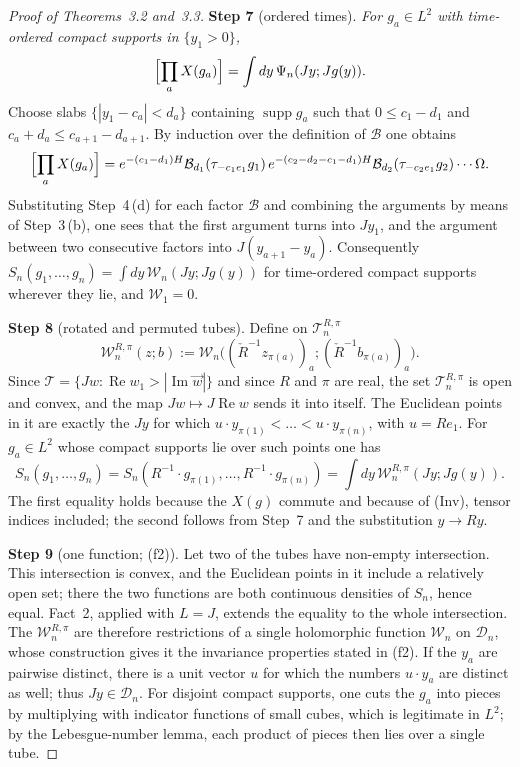 \documentclass[11pt,letterpaper,reqno]{amsart}
\theoremstyle{definition}
\begin{document}
\begin{proof}[Proof of Theorems~3.2 and~3.3]
\textbf{Step 7} (ordered times).
\emph{For $g_a\in L^2$ with time-ordered compact supports in $\{y_1>0\}$,}
\begin{equation*}
\Bigl[\prod_aX(g_a)\Bigr]=\int dy\,\Psi_n(Jy;Jg(y)).
\end{equation*}
Choose slabs $\{|y_1-c_a|<d_a\}$ containing $\operatorname{supp}g_a$ such that $0\le c_1-d_1$ and $c_a+d_a\le c_{a+1}-d_{a+1}$.
By induction over the definition of $\mathcal B$ one obtains
\begin{equation*}
\Bigl[\prod_aX(g_a)\Bigr]=e^{-(c_1-d_1)H}\mathcal B_{d_1}(\tau_{-c_1e_1}g_1)\,e^{-(c_2-d_2-c_1-d_1)H}\mathcal B_{d_2}(\tau_{-c_2e_1}g_2)\cdots\Omega.
\end{equation*}
Substituting Step~4\,(d) for each factor $\mathcal B$ and combining the arguments by means of Step~3\,(b), one sees that the first argument turns into $Jy_1$, and the argument between two consecutive factors into $J(y_{a+1}-y_a)$.
Consequently $S_n(g_1,\dots,g_n)=\int dy\,\mathcal W_n(Jy;Jg(y))$ for time-ordered compact supports wherever they lie, and $\mathcal W_1=0$.

\textbf{Step 8} (rotated and permuted tubes).
Define on $\mathcal T_n^{R,\pi}$
\begin{equation*}
\mathcal W_n^{R,\pi}(z;b):=\mathcal W_n\bigl((\check R^{-1}z_{\pi(a)})_a;(\check R^{-1}b_{\pi(a)})_a\bigr).
\end{equation*}
Since $\mathcal T=\{Jw:\operatorname{Re}w_1>|\operatorname{Im}\vec w|\}$ and since $R$ and $\pi$ are real, the set $\mathcal T_n^{R,\pi}$ is open and convex, and the map $Jw\mapsto J\operatorname{Re}w$ sends it into itself.
The Euclidean points in it are exactly the $Jy$ for which $u\cdot y_{\pi(1)}<\dots<u\cdot y_{\pi(n)}$, with $u=Re_1$.
For $g_a\in L^2$ whose compact supports lie over such points one has
\begin{equation*}
S_n(g_1,\dots,g_n)=S_n(R^{-1}\cdot g_{\pi(1)},\dots,R^{-1}\cdot g_{\pi(n)})=\int dy\,\mathcal W_n^{R,\pi}(Jy;Jg(y)).
\end{equation*}
The first equality holds because the $X(g)$ commute and because of (Inv), tensor indices included; the second follows from Step~7 and the substitution $y\to Ry$.

\textbf{Step 9} (one function; (f2)).
Let two of the tubes have non-empty intersection.
This intersection is convex, and the Euclidean points in it include a relatively open set; there the two functions are both continuous densities of $S_n$, hence equal.
Fact~2, applied with $L=J$, extends the equality to the whole intersection.
The $\mathcal W_n^{R,\pi}$ are therefore restrictions of a single holomorphic function $\mathcal W_n$ on $\mathcal D_n$, whose construction gives it the invariance properties stated in (f2).
If the $y_a$ are pairwise distinct, there is a unit vector $u$ for which the numbers $u\cdot y_a$ are distinct as well; thus $Jy\in\mathcal D_n$.
For disjoint compact supports, one cuts the $g_a$ into pieces by multiplying with indicator functions of small cubes, which is legitimate in $L^2$; by the Lebesgue-number lemma, each product of pieces then lies over a single tube.


\end{proof}
\end{document}
